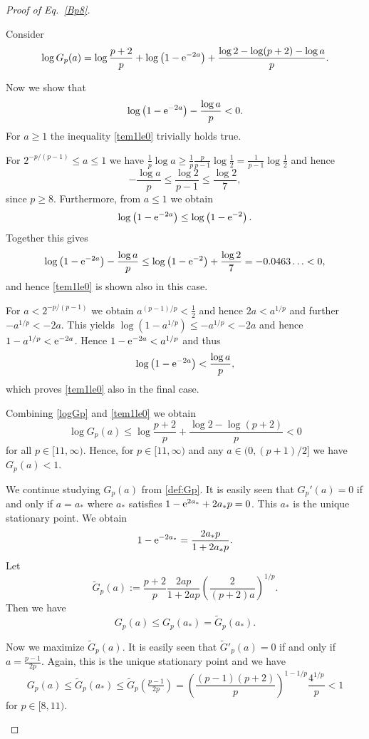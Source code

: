 \documentclass[12pt]{article}
\theoremstyle{remark}
\theoremstyle{definition}
\newcommand{\<}{\langle}
\renewcommand{\>}{\rangle}
\begin{document}
\begin{appendix}
\begin{proof}[Proof of Eq.~\eqref{Bp8}]
\begin{description}
Consider 
\begin{equation}\label{logGp}
\log G_p(a) =\log\frac{p+2}{p} + \log\left(1-{\rm e}^{-2 a}\right)+\frac{\log 2-\log(p+2)-\log a}{p}.
\end{equation}

Now we show that 
\begin{equation}\label{tem1le0}
\log\left(1-{\rm e}^{-2 a}\right)-\frac{\log a}{p} < 0.
\end{equation}
For $a \ge 1$ the inequality \eqref{tem1le0} trivially holds true. 

For $2^{-p/(p-1)} \le a \le 1$ we have $\tfrac{1}{p}\log a \ge \tfrac{1}{p}\tfrac{p}{p-1} \log \tfrac{1}{2} = \tfrac{1}{p-1}\log \tfrac{1}{2}$ and hence $$-\frac{\log a}{p} \le \frac{\log 2}{p-1} \le \frac{\log 2}{7},$$ since $p \ge 8$. Furthermore, from $a \le 1$ we obtain $$\log\left(1-{\rm e}^{-2 a}\right) \le \log\left(1-{\rm e}^{-2}\right).$$ Together this gives
\begin{align*}
\log\left(1-{\rm e}^{-2 a}\right)-\frac{\log a}{p} \le \log\left(1-{\rm e}^{-2}\right)+\frac{\log 2}{7} =-0.0463\ldots < 0,
\end{align*}
and hence \eqref{tem1le0} is shown also in this case.

For $a < 2^{-p/(p-1)}$ we obtain $a^{(p-1)/p} < \tfrac{1}{2}$ and hence $2 a < a^{1/p}$ and further $-a^{1/p} < -2a$. This yields $\log\left(1-a^{1/p}\right) \le - a^{1/p} < -2a$ and hence $1-a^{1/p}< {\rm e}^{-2 a}$. Hence $1-{\rm e}^{-2 a} < a^{1/p}$ and thus $$\log\left(1-{\rm e}^{-2 a}\right) < \frac{\log a}{p},$$ which proves \eqref{tem1le0} also in the final case.


Combining \eqref{logGp} and \eqref{tem1le0} we obtain
$$\log G_p(a) \le \log\frac{p+2}{p} +\frac{\log 2-\log(p+2)}{p} < 0$$ for all $p \in [11,\infty)$. Hence, for $p \in [11,\infty)$ and any $a \in (0,(p+1)/2]$ we have $G_p(a) < 1$.

\item[$p \in [8,11)$:] 
We continue studying $G_p(a)$ from \eqref{def:Gp}. It is easily seen that $G_p'(a)=0$ if and only if $a=a_{\ast}$ where $a_{\ast}$ satisfies $1-{\rm e}^{2 a_{\ast}}+2 a_{\ast} p=0$. This $a_{\ast}$ is the unique stationary point. We obtain $$1-{\rm e}^{-2 a_{\ast}} =\frac{2 a_{\ast} p}{1+2 a_{\ast} p}.$$ Let $$\widetilde{G}_p(a):=\frac{p+2}{p} \frac{2 a p}{1+2 a p}\left(\frac{2}{(p+2)a}\right)^{1/p}.$$ Then we have $$G_p(a) \le G_p(a_{\ast})=\widetilde{G}_p(a_{\ast}).$$

Now we maximize $\widetilde{G}_p(a)$. It is easily seen that $\widetilde{G}'_p(a)=0$ if and only if $a=\frac{p-1}{2 p}$. Again, this is the unique stationary point and we have $$G_p(a) \le \widetilde{G}_p(a_{\ast}) \le \widetilde{G}_p\left(\tfrac{p-1}{2 p}\right) = \left(\frac{(p-1)(p+2)}{p}\right)^{1-1/p} \frac{4^{1/p}}{p} < 1$$ for $p \in [8,11)$. 
\end{description}
\end{proof}
\end{appendix}
\end{document}
